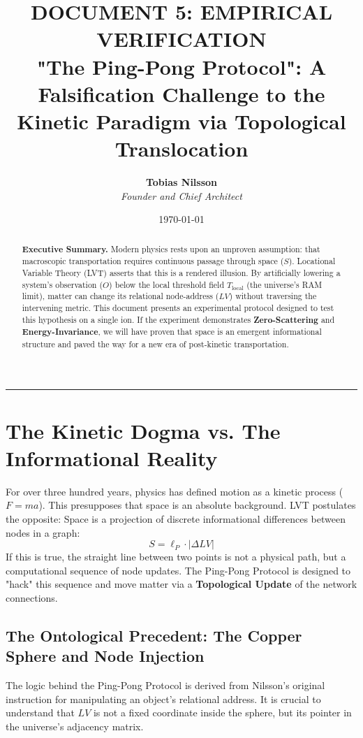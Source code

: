 \documentclass[12pt,a4paper]{article}
\title{\Huge
\textbf{DOCUMENT 5: EMPIRICAL VERIFICATION} \\ \large "The Ping-Pong Protocol": A Falsification Challenge to the Kinetic Paradigm via Topological Translocation}
\author{\textbf{Tobias Nilsson} \\ \textit{Founder and Chief Architect}}
\date{\today}
\begin{document}
\maketitle

\begin{abstract}
\noindent
\textbf{Executive Summary.} Modern physics rests upon an unproven assumption: that macroscopic transportation requires continuous passage through space ($S$). Locational Variable Theory (LVT) asserts that this is a rendered illusion. By artificially lowering a system's observation ($O$) below the local threshold field $T_{\mathrm{local}}$ (the universe's RAM limit), matter can change its relational node-address ($LV$) without traversing the intervening metric. This document presents an experimental protocol designed to test this hypothesis on a single ion. If the experiment demonstrates \textbf{Zero-Scattering} and \textbf{Energy-Invariance}, we will have proven that space is an emergent informational structure and paved the way for a new era of post-kinetic transportation.
\end{abstract}


\hrule
\vspace{1em}
\tableofcontents
\newpage
\section{The Kinetic Dogma vs. The Informational Reality}
For over three hundred years, physics has defined motion as a kinetic process ($F=ma$). This presupposes that space is an absolute background. LVT postulates the opposite: Space is a projection of discrete informational differences between nodes in a graph:
\begin{equation}
S = \ell_P \cdot |\Delta LV|
\end{equation}
If this is true, the straight line between two points is not a physical path, but a computational sequence of node updates. The Ping-Pong Protocol is designed to "hack" this sequence and move matter via a \textbf{Topological Update} of the network connections.

\subsection{The Ontological Precedent: The Copper Sphere and Node Injection}
The logic behind the Ping-Pong Protocol is derived from Nilsson's original instruction for manipulating an object's relational address. It is crucial to understand that $LV$ is not a fixed coordinate inside the sphere, but its pointer in the universe's adjacency matrix. 
\end{document}
